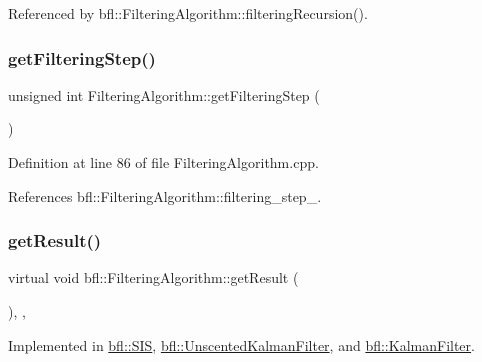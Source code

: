 Referenced by bfl\+::\+Filtering\+Algorithm\+::filtering\+Recursion().

\mbox{\label{classbfl_1_1FilteringAlgorithm_a8c43b1f3dac30934c0a03de348d4a29d}} 
\subsubsection{\texorpdfstring{get\+Filtering\+Step()}{getFilteringStep()}}
{\footnotesize\ttfamily unsigned int Filtering\+Algorithm\+::get\+Filtering\+Step (\begin{DoxyParamCaption}{ }\end{DoxyParamCaption})\hspace{0.3cm}{\ttfamily [inherited]}}



Definition at line 86 of file Filtering\+Algorithm.\+cpp.



References bfl\+::\+Filtering\+Algorithm\+::filtering\+\_\+step\+\_\+.

\mbox{\label{classbfl_1_1FilteringAlgorithm_acdfebf68405a427491e4dd9d020ae09b}} 
\subsubsection{\texorpdfstring{get\+Result()}{getResult()}}
{\footnotesize\ttfamily virtual void bfl\+::\+Filtering\+Algorithm\+::get\+Result (\begin{DoxyParamCaption}{ }\end{DoxyParamCaption})\hspace{0.3cm}{\ttfamily [protected]}, {}, {\ttfamily [inherited]}}



Implemented in \mbox{\hyperlink{classbfl_1_1SIS_a059da4c932379643ff7005fe4d0fda89}{bfl\+::\+S\+IS}}, \mbox{\hyperlink{classbfl_1_1UnscentedKalmanFilter_ad25c4f9143bbe834b3adfc81c78b6743}{bfl\+::\+Unscented\+Kalman\+Filter}}, and \mbox{\hyperlink{classbfl_1_1KalmanFilter_a24484fb845495f43628db19062937548}{bfl\+::\+Kalman\+Filter}}.

